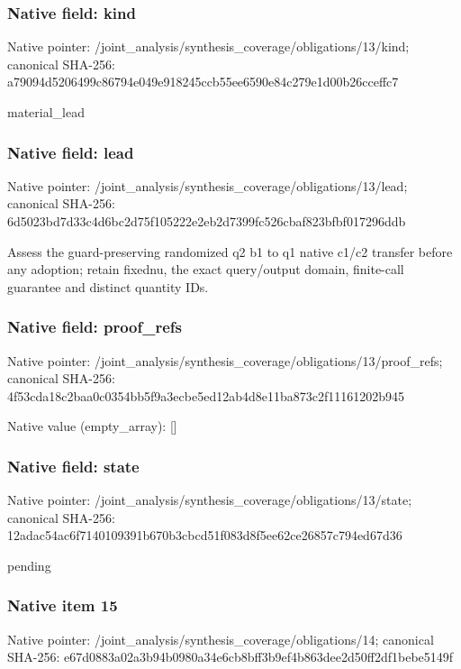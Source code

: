 \documentclass[10pt,a4paper]{article}
\begin{document}
\subsubsection{Native field: kind}
Native pointer: /joint\_\allowbreak{}analysis/synthesis\_\allowbreak{}coverage/obligations/13/kind; canonical SHA-256: a79094d5206499c86794e049e918245ccb55ee6590e84c279e1d00b26cceffc7

\begingroup\raggedright\sloppy material\_\allowbreak{}lead\par\endgroup

\subsubsection{Native field: lead}
Native pointer: /joint\_\allowbreak{}analysis/synthesis\_\allowbreak{}coverage/obligations/13/lead; canonical SHA-256: 6d5023bd7d33c4d6bc2d75f105222e2eb2d7399fc526cbaf823bfbf017296ddb

\begingroup\raggedright\sloppy Assess the guard-preserving randomized q2 b1 to q1 native c1/\allowbreak{}c2 transfer before any adoption;\allowbreak{} retain fixednu,\allowbreak{} the exact query/\allowbreak{}output domain,\allowbreak{} finite-call guarantee and distinct quantity IDs.\par\endgroup

\subsubsection{Native field: proof\_\allowbreak{}refs}
Native pointer: /joint\_\allowbreak{}analysis/synthesis\_\allowbreak{}coverage/obligations/13/proof\_\allowbreak{}refs; canonical SHA-256: 4f53cda18c2baa0c0354bb5f9a3ecbe5ed12ab4d8e11ba873c2f11161202b945

Native value (empty\_\allowbreak{}array): []

\subsubsection{Native field: state}
Native pointer: /joint\_\allowbreak{}analysis/synthesis\_\allowbreak{}coverage/obligations/13/state; canonical SHA-256: 12adac54ac6f7140109391b670b3cbcd51f083d8f5ee62ce26857c794ed67d36

\begingroup\raggedright\sloppy pending\par\endgroup

\subsubsection{Native item 15}
Native pointer: /joint\_\allowbreak{}analysis/synthesis\_\allowbreak{}coverage/obligations/14; canonical SHA-256: e67d0883a02a3b94b0980a34e6cb8bff3b9ef4b863dee2d50ff2df1bebe5149f
\end{document}
